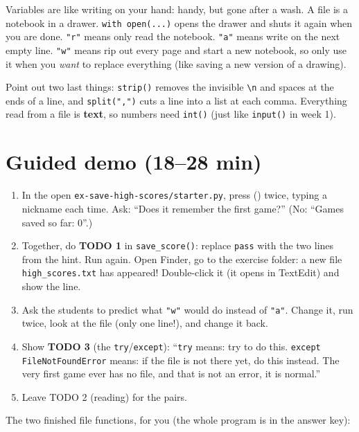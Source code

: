 \begin{analogy}
Variables are like writing on your hand: handy, but gone after a wash. A file is a notebook in a drawer.
\texttt{with open(...)} opens the drawer and shuts it again when you are done. \texttt{"r"} means only read the notebook.
\texttt{"a"} means write on the next empty line. \texttt{"w"} means rip out every page and start a new notebook, so only use it when you
\emph{want} to replace everything (like saving a new version of a drawing).
\end{analogy}
Point out two last things: \texttt{strip()} removes the invisible \texttt{\textbackslash n} and spaces at the ends of a line, and \texttt{split(",")}
cuts a line into a list at each comma. Everything read from a file is \textbf{text}, so numbers need \texttt{int()} (just like \texttt{input()} in week 1).

\section{Guided demo (18--28 min)}
\begin{workedexample}
\begin{enumerate}[leftmargin=1.4em]
  \item In the open \texttt{ex-save-high-scores/starter.py}, press  () twice, typing a nickname each time.
        Ask: \enquote{Does it remember the first game?} (No: \enquote{Games saved so far: 0}.)
  \item Together, do \textbf{TODO 1} in \texttt{save\_score()}: replace \texttt{pass} with the two lines from the hint. Run again.
        Open Finder, go to the exercise folder: a new file \texttt{high\_scores.txt} has appeared! Double-click it (it opens in TextEdit) and show the line.
  \item Ask the students to predict what \texttt{"w"} would do instead of \texttt{"a"}. Change it, run twice, look at the file (only one line!), and change it back.
  \item Show \textbf{TODO 3} (the \texttt{try}/\texttt{except}): \enquote{\texttt{try} means: try to do this. \texttt{except FileNotFoundError} means: if the file is not there yet,
        do this instead. The very first game ever has no file, and that is not an error, it is normal.}
  \item Leave TODO 2 (reading) for the pairs.
\end{enumerate}
\end{workedexample}
The two finished file functions, for you (the whole program is in the answer key):

